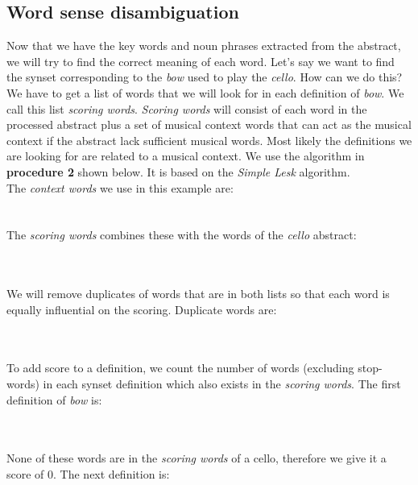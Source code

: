 \subsection{Word sense disambiguation}
Now that we have the key words and noun phrases extracted from the abstract, we will try to find the correct meaning of each word. Let's say we want to find the synset corresponding to the \emph{bow} used to play the \emph{cello}. How can we do this? We have to get a list of words that we will look for in each definition of \emph{bow}. We call this list \emph{scoring words}. \emph{Scoring words} will consist of each word in the processed abstract plus a set of musical context words that can act as the musical context if the abstract lack sufficient musical words. Most likely the definitions we are looking for are related to a musical context. We use the algorithm in \textbf{procedure 2} shown below. It is based on the \emph{Simple Lesk} algorithm.
\\The \emph{context words} we use in this example are:\\
\noindent{}
\\\\The \emph{scoring words} combines these with the words of the \emph{cello} abstract:

\noindent{}
\\\\We will remove duplicates of words that are in both lists so that each word is equally influential on the scoring. Duplicate words are:

\noindent{}
\\\\To add score to a definition, we count the number of words (excluding stop-words) in each synset definition which also exists in the \emph{scoring words}. The first definition of \emph{bow} is:

\noindent{}
\\\\None of these words are in the \emph{scoring words} of a cello, therefore we give it a score of 0. The next definition is:\\

